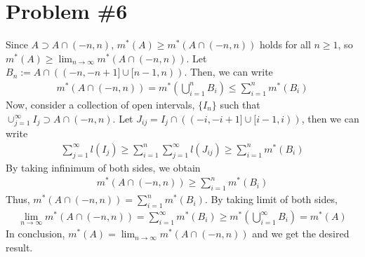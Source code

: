 \documentclass{scrartcl}
\begin{document}
\section{Problem \#6}
Since \(A \supset A \cap (-n, n)\), \(m^*(A) \ge m^*(A \cap (-n, n))\) holds
for all \(n \ge 1\), so \(m^*(A) \ge \lim_{n \to \infty} m^*(A \cap (-n, n))\).
Let \(B_n := A \cap ((-n, -n + 1] \cup [n - 1, n))\). Then, we can write
\begin{align*}
  m^*(A \cap (-n, n))
  = m^* \left( \bigcup^n_{i = 1} B_i \right)
  \le \sum^n_{i = 1} m^*(B_i)
\end{align*}
Now, consider a collection of open intervals, \(\{I_n\}\) such that
\(\cup^\infty_{j = 1} I_j \supset A \cap (-n, n)\). Let \(J_{ij} = I_j \cap
((-i, -i + 1] \cup [i - 1, i))\), then we can write
\begin{align*}
  \sum^\infty_{j = 1} l(I_j)
  \ge \sum^n_{i = 1} \sum^\infty_{j = 1} l(J_{ij})
  \ge \sum^n_{i = 1} m^*(B_i)
\end{align*}
By taking infinimum of both sides, we obtain
\begin{align*}
  m^*(A \cap (-n, n))
  \ge \sum^n_{i = 1} m^*(B_i)
\end{align*}
Thus, \(m^*(A \cap (-n, n)) = \sum^n_{i = 1} m^*(B_i)\). By taking limit of
both sides,
\begin{align*}
  \lim_{n \to \infty} m^*(A \cap (-n, n))
  = \sum^\infty_{i = 1} m^*(B_i)
  \ge m^* \left( \bigcup^\infty_{i = 1} B_i \right)
  = m^*(A)
\end{align*}
In conclusion, \(m^*(A) = \lim_{n \to \infty} m^*(A \cap (-n, n))\) and we get
the desired result.
\end{document}
